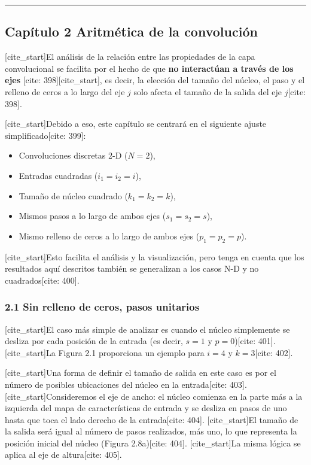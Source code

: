 \documentclass[
  super,
  preprint,
  3p]{elsarticle}
\providecommand{\tightlist}{%
  \setlength{\itemsep}{0pt}\setlength{\parskip}{0pt}}\usepackage{longtable,booktabs,array}
\begin{document}
\begin{center}\rule{0.5\linewidth}{0.5pt}\end{center}

\subsection{Capítulo 2 Aritmética de la
convolución}\label{capuxedtulo-2-aritmuxe9tica-de-la-convoluciuxf3n}

{[}cite\_start{]}El análisis de la relación entre las propiedades de la
capa convolucional se facilita por el hecho de que \textbf{no
interactúan a través de los ejes} {[}cite: 398{]}{[}cite\_start{]}, es
decir, la elección del tamaño del núcleo, el paso y el relleno de ceros
a lo largo del eje \(j\) solo afecta el tamaño de la salida del eje
\(j\){[}cite: 398{]}.

{[}cite\_start{]}Debido a eso, este capítulo se centrará en el siguiente
ajuste simplificado{[}cite: 399{]}:

\begin{itemize}
\tightlist
\item
  Convoluciones discretas 2-D (\(N = 2\)),
\item
  Entradas cuadradas (\(i_1 = i_2 = i\)),
\item
  Tamaño de núcleo cuadrado (\(k_1 = k_2 = k\)),
\item
  Mismos pasos a lo largo de ambos ejes (\(s_1 = s_2 = s\)),
\item
  Mismo relleno de ceros a lo largo de ambos ejes (\(p_1 = p_2 = p\)).
\end{itemize}

{[}cite\_start{]}Esto facilita el análisis y la visualización, pero
tenga en cuenta que los resultados aquí descritos también se generalizan
a los casos N-D y no cuadrados{[}cite: 400{]}.

\subsubsection{2.1 Sin relleno de ceros, pasos
unitarios}\label{sin-relleno-de-ceros-pasos-unitarios}

{[}cite\_start{]}El caso más simple de analizar es cuando el núcleo
simplemente se desliza por cada posición de la entrada (es decir,
\(s = 1\) y \(p = 0\)){[}cite: 401{]}. {[}cite\_start{]}La Figura 2.1
proporciona un ejemplo para \(i = 4\) y \(k = 3\){[}cite: 402{]}.

{[}cite\_start{]}Una forma de definir el tamaño de salida en este caso
es por el número de posibles ubicaciones del núcleo en la
entrada{[}cite: 403{]}. {[}cite\_start{]}Consideremos el eje de ancho:
el núcleo comienza en la parte más a la izquierda del mapa de
características de entrada y se desliza en pasos de uno hasta que toca
el lado derecho de la entrada{[}cite: 404{]}. {[}cite\_start{]}El tamaño
de la salida será igual al número de pasos realizados, más uno, lo que
representa la posición inicial del núcleo (Figura 2.8a){[}cite: 404{]}.
{[}cite\_start{]}La misma lógica se aplica al eje de altura{[}cite:
405{]}.
\end{document}

